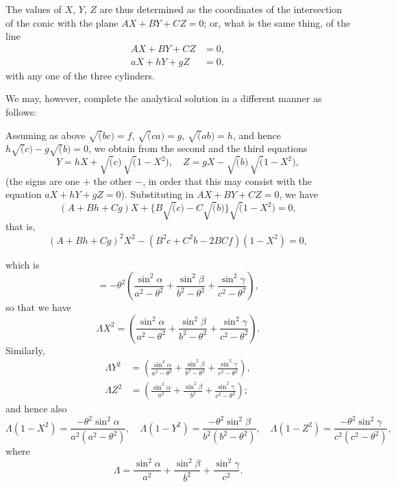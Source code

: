 \documentclass[11pt,a4paper]{book}
\begin{document}
The values of $X$, $Y$, $Z$ are thus determined as the coordinates of the intersection of the conic with the plane $AX + BY + CZ = 0$; or, what is the same thing, of the line
\begin{align*}
AX + BY + CZ &= 0,\\
aX + hY + gZ &= 0,
\end{align*}
with any one of the three cylinders.

We may, however, complete the analytical solution in a different manner as follows:

Assuming as above $\surd(bc) = f$, $\surd(ca) = g$, $\surd(ab) = h$, and hence $h\surd(c) - g\surd(b) = 0$, we obtain from the second and the third equations
\[
Y = hX + \surd(c)\,\surd(1-X^2),\quad Z = gX - \surd(b)\,\surd(1-X^2),
\]
(the signs are one $+$ the other $-$, in order that this may consist with the equation $aX + hY + gZ = 0$). Substituting in $AX + BY + CZ = 0$, we have
\[
(A + Bh + Cg)X + \{B\surd(c) - C\surd(b)\}\surd(1-X^2) = 0,
\]
that is,
\[
(A + Bh + Cg)^2 X^2 - (B^2c + C^2b - 2BCf)(1-X^2) = 0,
\]

which is
\[
= -\theta^2\left(\frac{\sin^2\alpha}{a^2-\theta^2} + \frac{\sin^2\beta}{b^2-\theta^2} + \frac{\sin^2\gamma}{c^2-\theta^2}\right),
\]
so that we have
\[
\Lambda X^2 = \left(\frac{\sin^2\alpha}{a^2-\theta^2} + \frac{\sin^2\beta}{b^2-\theta^2} + \frac{\sin^2\gamma}{c^2-\theta^2}\right).
\]
Similarly,
\begin{align*}
\Lambda Y^2 &= \left(\frac{\sin^2\alpha}{a^2-\theta^2} + \frac{\sin^2\beta}{b^2-\theta^2} + \frac{\sin^2\gamma}{c^2-\theta^2}\right),\\
\Lambda Z^2 &= \left(\frac{\sin^2\alpha}{a^2} + \frac{\sin^2\beta}{b^2} + \frac{\sin^2\gamma}{c^2-\theta^2}\right);
\end{align*}
and hence also
\[
\Lambda(1-X^2) = \frac{-\theta^2\sin^2\alpha}{a^2(a^2-\theta^2)},\quad \Lambda(1-Y^2) = \frac{-\theta^2\sin^2\beta}{b^2(b^2-\theta^2)},\quad \Lambda(1-Z^2) = \frac{-\theta^2\sin^2\gamma}{c^2(c^2-\theta^2)},
\]
where
\[
\Lambda = \frac{\sin^2\alpha}{a^2} + \frac{\sin^2\beta}{b^2} + \frac{\sin^2\gamma}{c^2}.
\]
\end{document}
